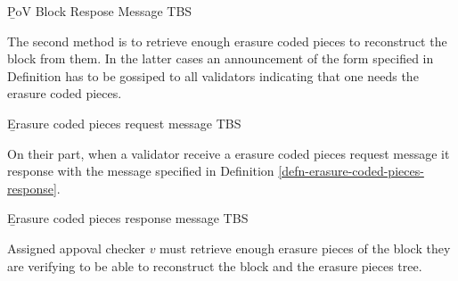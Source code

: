 \begin{definition}
  \label{defn-pov-block-response}
        {\b PoV Block Respose} Message TBS
\end{definition}

The second method is to retrieve enough erasure coded pieces to reconstruct the block from them. In the latter cases an announcement of the form specified in Definition has to be gossiped to all validators indicating that one needs the erasure coded pieces.

\begin{definition}
  \label{defn-erasure-coded-pieces-request}
        {\b Erasure coded pieces request message} TBS
\end{definition}

On their part, when a validator  receive a erasure coded pieces request message it response with the message specified in Definition \ref{defn-erasure-coded-pieces-response}.

\begin{definition}
  \label{defn-erasure-coded-pieces-response}
        {\b Erasure coded pieces response message} TBS
\end{definition}

Assigned appoval checker $v$ must retrieve enough erasure pieces of the block they are verifying to be able to reconstruct the block and the erasure pieces tree.




